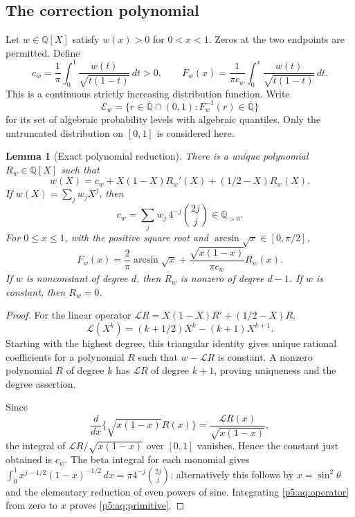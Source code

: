 \documentclass[11pt,a4paper]{article}
\newtheorem{lemma}[theorem]{Lemma}
\theoremstyle{definition}
\theoremstyle{remark}
\numberwithin{equation}{section}
\begin{document}
\subsection{The correction polynomial}

Let $w\in\mathbb Q[X]$ satisfy $w(x)>0$ for $0<x<1$.
Zeros at the two endpoints are permitted. Define
\begin{equation}\label{p5:aq:cdf}
 c_w=\frac1\pi\int_0^1\frac{w(t)}{\sqrt{t(1-t)}}\,dt>0,\qquad
 F_w(x)=\frac1{\pi c_w}\int_0^x
                \frac{w(t)}{\sqrt{t(1-t)}}\,dt .
\end{equation}
This is a continuous strictly increasing distribution function.
Write
\[
 \mathcal E_w=\{r\in\overline{\mathbb Q}\cap(0,1):
                      F_w^{-1}(r)\in\overline{\mathbb Q}\}
\]
for its set of algebraic probability levels with algebraic quantiles.
Only the untruncated distribution on $[0,1]$ is considered here.

\begin{lemma}[Exact polynomial reduction]\label{p5:aq:reduction}
There is a unique polynomial $R_w\in\mathbb Q[X]$ such that
\begin{equation}\label{p5:aq:operator}
 w(X)=c_w+X(1-X)R_w'(X)+(1/2-X)R_w(X).
\end{equation}
If $w(X)=\sum_jw_jX^j$, then
\[
 c_w=\sum_j w_j\,4^{-j}\binom{2j}{j}\in\mathbb Q_{>0}.
\]
For $0\le x\le1$, with the positive square root and
$\arcsin\sqrt{x}\in[0,\pi/2]$,
\begin{equation}\label{p5:aq:primitive}
 F_w(x)=\frac{2}{\pi}\arcsin\sqrt{x}
        +\frac{\sqrt{x(1-x)}}{\pi c_w}R_w(x).
\end{equation}
If $w$ is nonconstant of degree $d$, then $R_w$ is nonzero of
degree $d-1$. If $w$ is constant, then $R_w=0$.
\end{lemma}

\begin{proof}
For the linear operator
$\mathcal L R=X(1-X)R'+(1/2-X)R$,
\[
 \mathcal L(X^k)=(k+1/2)X^k-(k+1)X^{k+1}.
\]
Starting with the highest degree, this triangular identity gives
unique rational coefficients for a polynomial $R$ such that
$w-\mathcal LR$ is constant. A nonzero polynomial $R$ of degree
$k$ has $\mathcal LR$ of degree $k+1$, proving uniqueness and
the degree assertion.

Since
\[
 \frac{d}{dx}\{\sqrt{x(1-x)}R(x)\}
   =\frac{\mathcal LR(x)}{\sqrt{x(1-x)}},
\]
the integral of $\mathcal LR/\sqrt{x(1-x)}$ over $[0,1]$
vanishes. Hence the constant just obtained is $c_w$.
The beta integral for each monomial gives
$\int_0^1x^{j-1/2}(1-x)^{-1/2}\,dx
 =\pi4^{-j}\binom{2j}{j}$; alternatively this follows by
$x=\sin^2\theta$ and the elementary reduction of even powers
of sine. Integrating \eqref{p5:aq:operator} from zero to $x$
proves \eqref{p5:aq:primitive}.
\end{proof}
\end{document}
